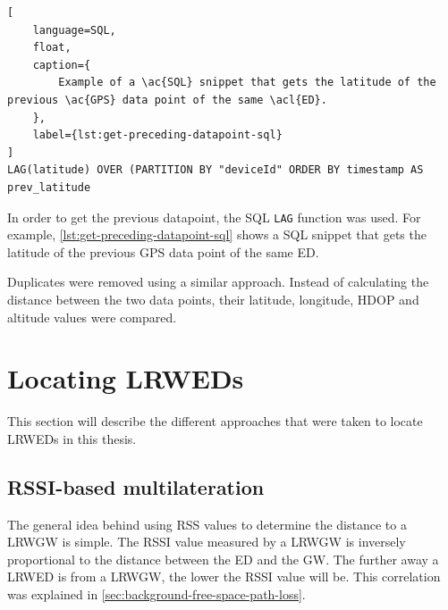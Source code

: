 \begin{lstlisting}[
    language=SQL,
    float,
    caption={
        Example of a \ac{SQL} snippet that gets the latitude of the previous \ac{GPS} data point of the same \acl{ED}.
    },
    label={lst:get-preceding-datapoint-sql}
]
LAG(latitude) OVER (PARTITION BY "deviceId" ORDER BY timestamp AS prev_latitude
\end{lstlisting}

In order to get the previous datapoint, the SQL \lstinline|LAG| function was used.
For example, \cref{lst:get-preceding-datapoint-sql} shows a \ac{SQL} snippet that gets the latitude of the previous \ac{GPS} data point of the same \acl{ED}.

Duplicates were removed using a similar approach.
Instead of calculating the distance between the two data points, their latitude, longitude, \ac{HDOP} and altitude values were compared.

\section{Locating \aclp{LRWED}}

This section will describe the different approaches that were taken to locate \aclp{LRWED} in this thesis.

\subsection{\acs{RSSI}-based multilateration}\label{sec:rssi-based-multilateration-implementation}

The general idea behind using \ac{RSS} values to determine the distance to a \acl{LRWGW} is simple.
The \ac{RSSI} value measured by a \acl{LRWGW} is inversely proportional to the distance between the \acl{ED} and the \acl{GW}.
The further away a \acl{LRWED} is from a \acl{LRWGW}, the lower the \ac{RSSI} value will be.
This correlation was explained in \cref{sec:background-free-space-path-loss}.


